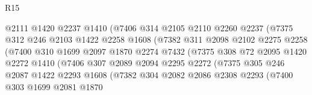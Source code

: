\begin{lexlean}{R15}
\begin{coremodule}
                            @2111
                            @1420
                            @2237
                            @1410
                            (@7406
                              @314
                              @2105
                              @2110
                              @2260
                              @2237
                              (@7375
                                @312
                                @246
                                @2103
                                @1422
                                @2258
                                @1608
                                (@7382
                                  @311
                                  @2098
                                  @2102
                                  @2275
                                  @2258
                                  (@7400
                                    @310
                                    @1699
                                    @2097
                                    @1870
                                    @2274
                                    @7432
                                    (@7375
                                      @308
                                      @72
                                      @2095
                                      @1420
                                      @2272
                                      @1410
                                      (@7406
                                        @307
                                        @2089
                                        @2094
                                        @2295
                                        @2272
                                        (@7375
                                          @305
                                          @246
                                          @2087
                                          @1422
                                          @2293
                                          @1608
                                          (@7382
                                            @304
                                            @2082
                                            @2086
                                            @2308
                                            @2293
                                            (@7400
                                              @303
                                              @1699
                                              @2081
                                              @1870

\end{coremodule}
\end{lexlean}

